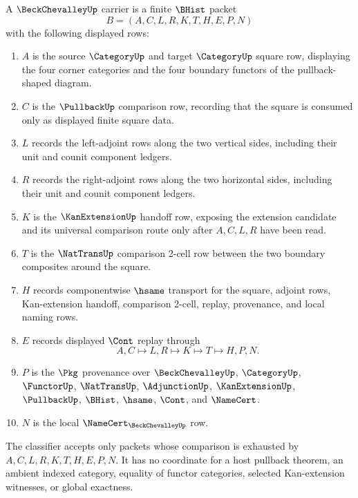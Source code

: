 \begin{definition}
\label{def:beck-chevalley-carrier}
A $\BeckChevalleyUp$ carrier is a finite $\BHist$ packet
$$
B=(A,C,L,R,K,T,H,E,P,N)
$$
with the following displayed rows:
\begin{enumerate}
\item $A$ is the source $\CategoryUp$ and target $\CategoryUp$ square row, displaying the four corner categories and the four boundary functors of the pullback-shaped diagram.
\item $C$ is the $\PullbackUp$ comparison row, recording that the square is consumed only as displayed finite square data.
\item $L$ records the left-adjoint rows along the two vertical sides, including their unit and counit component ledgers.
\item $R$ records the right-adjoint rows along the two horizontal sides, including their unit and counit component ledgers.
\item $K$ is the $\KanExtensionUp$ handoff row, exposing the extension candidate and its universal comparison route only after $A,C,L,R$ have been read.
\item $T$ is the $\NatTransUp$ comparison 2-cell row between the two boundary composites around the square.
\item $H$ records componentwise $\hsame$ transport for the square, adjoint rows, Kan-extension handoff, comparison 2-cell, replay, provenance, and local naming rows.
\item $E$ records displayed $\Cont$ replay through
$$
A,C \longmapsto L,R \longmapsto K \longmapsto T \longmapsto H,P,N .
$$
\item $P$ is the $\Pkg$ provenance over $\BeckChevalleyUp$, $\CategoryUp$, $\FunctorUp$, $\NatTransUp$, $\AdjunctionUp$, $\KanExtensionUp$, $\PullbackUp$, $\BHist$, $\hsame$, $\Cont$, and $\NameCert$.
\item $N$ is the local $\NameCert_{\BeckChevalleyUp}$ row.
\end{enumerate}
The classifier accepts only packets whose comparison is exhausted by $A,C,L,R,K,T,H,E,P,N$. It has no coordinate for a host pullback theorem, an ambient indexed category, equality of functor categories, selected Kan-extension witnesses, or global exactness.
\end{definition}

